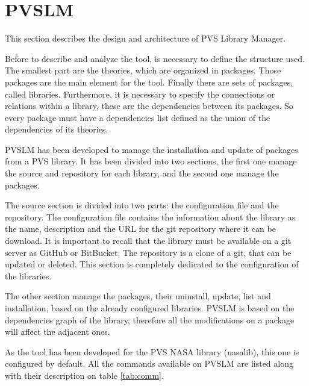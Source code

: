 \section{PVSLM}
\label{sec:pvslm}

This section describes the design and architecture of PVS Library Manager.

Before to describe and analyze the tool, is necessary to define the structure used. The smallest part are the theories, which are organized in packages. Those packages are the main element for the tool. Finally there are sets of packages, called libraries. Furthermore, it is necessary to specify the connections or relations within a library, these are the dependencies between its packages. So every package must have a dependencies list defined as the union of the dependencies of its theories.

PVSLM has been developed to manage the installation and update of packages from a PVS library. It has been divided into two sections, the first one manage the source and repository for each library, and the second one manage the packages.

The source section is divided into two parts: the configuration file and the repository. The configuration file contains the information about the library as the name, description and the URL for the git repository where it can be download. It is important to recall that the library must be available on a git server as GitHub or BitBucket. The repository is a clone of a git, that can be updated or deleted. This section is completely dedicated to the configuration of the libraries.

The other section manage the packages, their uninstall, update, list and installation, based on the already configured libraries. PVSLM is based on the dependencies graph of the library, therefore all the modifications on a package will affect the adjacent ones.

As the tool has been developed for the PVS NASA library (nasalib), this one is configured by default. All the commands available on PVSLM are listed along with their description on table \ref{tab:comm}.

